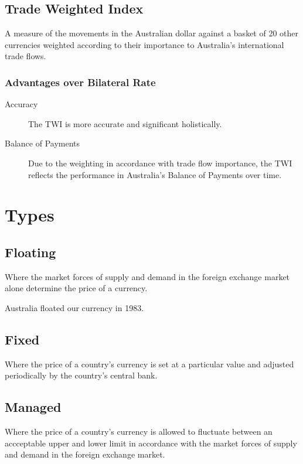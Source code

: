 \documentclass[a4paper,11pt]{report}
\begin{document}
\subsection{Trade Weighted Index}

A measure of the movements in the Australian dollar against a basket of 20
other currencies weighted according to their importance to Australia's
international trade flows.

\subsubsection{Advantages over Bilateral Rate}

\begin{description}
\item [Accuracy] The TWI is more accurate and significant holistically.
\item [Balance of Payments] Due to the weighting in accordance with trade flow
	importance, the TWI reflects the performance in Australia's Balance of
	Payments over time.
\end{description}


\section{Types}

\subsection{Floating}

Where the market forces of supply and demand in the foreign exchange market
alone determine the price of a currency.

Australia floated our currency in 1983.

\subsection{Fixed}

Where the price of a country's currency is set at a particular value and
adjusted periodically by the country's central bank.

\subsection{Managed}

Where the price of a country's currency is allowed to fluctuate between an
accceptable upper and lower limit in accordance with the market forces of
supply and demand in the foreign exchange market.
\end{document}

